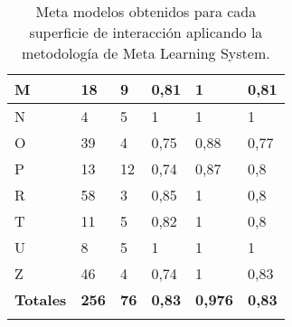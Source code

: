 \begin{longtable}[c]{|l|l|l|l|l|l|}
	M                                     & 18                                     & 9                                                                                   & 0,81                                   & 1                                    & 0,81                                    \\ \hline
	N                                     & 4                                      & 5                                                                                   & 1                                      & 1                                    & 1                                       \\ \hline
	O                                     & 39                                     & 4                                                                                   & 0,75                                   & 0,88                                 & 0,77                                    \\ \hline
	P                                     & 13                                     & 12                                                                                  & 0,74                                   & 0,87                                 & 0,8                                     \\ \hline
	R                                     & 58                                     & 3                                                                                   & 0,85                                   & 1                                    & 0,8                                     \\ \hline
	T                                     & 11                                     & 5                                                                                   & 0,82                                   & 1                                    & 0,8                                     \\ \hline
	U                                     & 8                                      & 5                                                                                   & 1                                      & 1                                    & 1                                       \\ \hline
	Z                                     & 46                                     & 4                                                                                   & 0,74                                   & 1                                    & 0,83                                    \\ \hline
	\textbf{Totales}                      & \textbf{256}                           & \textbf{76}                                                                         & \textbf{0,83}                          & \textbf{0,976}                       & \textbf{0,83}                           \\ \hline
	\caption{Meta modelos obtenidos para cada superficie de interacción aplicando la metodología de Meta Learning System.}
	\label{tab:metaModels}\\
\end{longtable}

